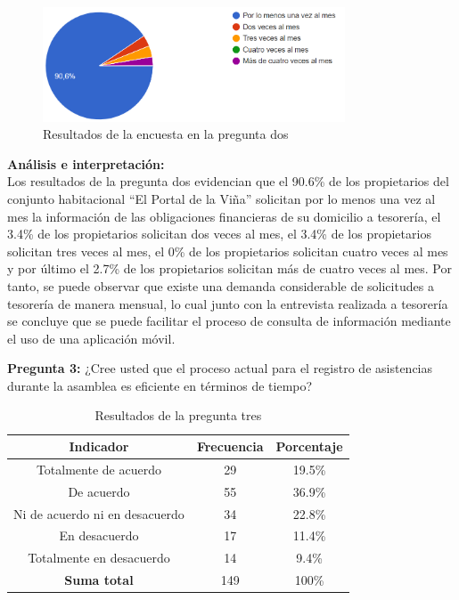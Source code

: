     \begin{figure}[H]
              \centering
              \includegraphics[width=0.8\textwidth]{resources/images/p2}
              \caption{Resultados de la encuesta en la pregunta dos}\label{fig:figure_p2}
    \end{figure}

\textbf{Análisis e interpretación:}\\
Los resultados de la pregunta dos evidencian que el 90.6\% de los propietarios del conjunto habitacional {\textquotedblleft}El Portal de la Viña{\textquotedblright} solicitan por lo menos una vez al mes la información de las obligaciones financieras de su domicilio a tesorería, el 3.4\% de los propietarios solicitan dos veces al mes, el 3.4\% de los propietarios solicitan tres veces al mes, el 0\% de los propietarios solicitan cuatro veces al mes y por último el 2.7\% de los propietarios solicitan más de cuatro veces al mes.
Por tanto, se puede observar que existe una demanda considerable de solicitudes a tesorería de manera mensual, lo cual junto con la entrevista realizada a tesorería se concluye que se puede facilitar el proceso de consulta de información mediante el uso de una aplicación móvil.

\bigbreak
\textbf{Pregunta 3:} ¿Cree usted que el proceso actual para el registro de asistencias durante la asamblea es eficiente en términos de tiempo?

    \begin{table}[H]
        \centering
        \caption{Resultados de la pregunta tres}
        \begin{footnotesize}
        \begin{tabular}{|c|c|c|}
            \hline
            \textbf{Indicador} & \textbf{Frecuencia} &  \textbf{Porcentaje} \\
            \hline
            Totalmente de acuerdo & 29 & 19.5\% \\
            \hline
            De acuerdo & 55 & 36.9\% \\
            \hline
            Ni de acuerdo ni en desacuerdo & 34 & 22.8\% \\
            \hline
            En desacuerdo & 17 & 11.4\% \\
            \hline
            Totalmente en desacuerdo & 14 & 9.4\% \\
            \hline
            \textbf{Suma total} & 149 & 100\% \\
            \hline
        \end{tabular}\label{tab:table_preg_3}
        \end{footnotesize}
    \end{table}

